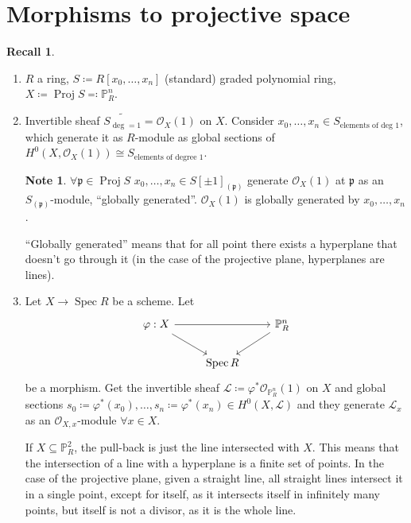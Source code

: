 \documentclass[12pt]{article}
\DeclareMathOperator{\Spec}{Spec}
\DeclareMathOperator{\Proj}{Proj}
\theoremstyle{definition}
\newtheorem*{note}{Note}
\newtheorem*{recall}{Recall}
\begin{document}
\section{Morphisms to projective space}
\begin{recall}
\begin{enumerate}[label=\arabic*)]
\item $R$ a ring, $S\coloneqq R[x_0,\ldots,x_n]$ (standard) graded polynomial ring, $X\coloneqq\Proj S\eqqcolon\mathbb P_R^n$.

\item Invertible sheaf $\widetilde{S_{\deg=1}}=\mathcal O_X(1)$ on $X$. Consider $x_0,\ldots,x_n\in S_{\text{elements of deg }1}$, which generate it as $R$-module as global sections of $H^0(X,\mathcal O_X(1))\cong S_{\text{elements of degree }1}$.

\begin{note}
$\forall\mathfrak p\in\Proj S$ $x_0,\ldots,x_n\in S[\pm1]_{(\mathfrak p)}$ generate $\mathcal O_X(1)$ at $\mathfrak p$ as an $S_{(\mathfrak p)}$-module, ``globally generated''. $\mathcal O_X(1)$ is globally generated by $x_0,\ldots,x_n$.
\end{note}

``Globally generated'' means that for all point there exists a hyperplane that doesn't go through it (in the case of the projective plane, hyperplanes are lines).

\item Let $X\rightarrow\Spec R$ be a scheme. Let
\[\begin{tikzcd}\varphi:X\arrow[rr]\arrow[rd]&&\mathbb P_R^n\arrow[ld]\\&\Spec R\end{tikzcd}\]
be a morphism. Get the invertible sheaf $\mathcal L\coloneqq\varphi^*\mathcal O_{\mathbb P_R^n}(1)$ on $X$ and global sections $s_0\coloneqq\varphi^*(x_0),\ldots,s_n\coloneqq\varphi^*(x_n)\in H^0(X,\mathcal L)$ and they generate $\mathcal L_x$ as an $\mathcal O_{X,x}$-module $\forall x\in X$.

If $X\subseteq\mathbb P_R^2$, the pull-back is just the line intersected with $X$. This means that the intersection of a line with a hyperplane is a finite set of points. In the case of the projective plane, given a straight line, all straight lines intersect it in a single point, except for itself, as it intersects itself in infinitely many points, but itself is not a divisor, as it is the whole line.
\end{enumerate}
\end{recall}
\end{document}
